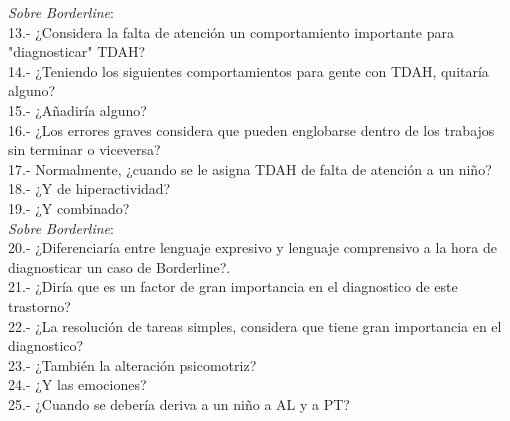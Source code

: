 \documentclass[letterpaper,12pt]{article}
\begin{document}
\textit{Sobre Borderline}: \\
13.- ¿Considera la falta de atención un comportamiento importante para "diagnosticar" TDAH? \\
14.- ¿Teniendo los siguientes comportamientos para gente con TDAH, quitaría alguno? \\
15.- ¿Añadiría alguno? \\
16.- ¿Los errores graves considera que pueden englobarse dentro de los trabajos sin terminar o viceversa? \\
17.- Normalmente, ¿cuando se le asigna TDAH de falta de atención a un niño? \\
18.- ¿Y de hiperactividad? \\
19.- ¿Y combinado? \\

\textit{Sobre Borderline}: \\
20.- ¿Diferenciaría entre lenguaje expresivo y lenguaje comprensivo a la hora de diagnosticar un caso de Borderline?. \\
21.- ¿Diría que es un factor de gran importancia en el diagnostico de este trastorno? \\
22.- ¿La resolución de tareas simples, considera que tiene gran importancia en el diagnostico? \\
23.- ¿También la alteración psicomotriz? \\
24.- ¿Y las emociones? \\

25.- ¿Cuando se debería deriva a un niño a AL y a PT? \\
\end{document}
